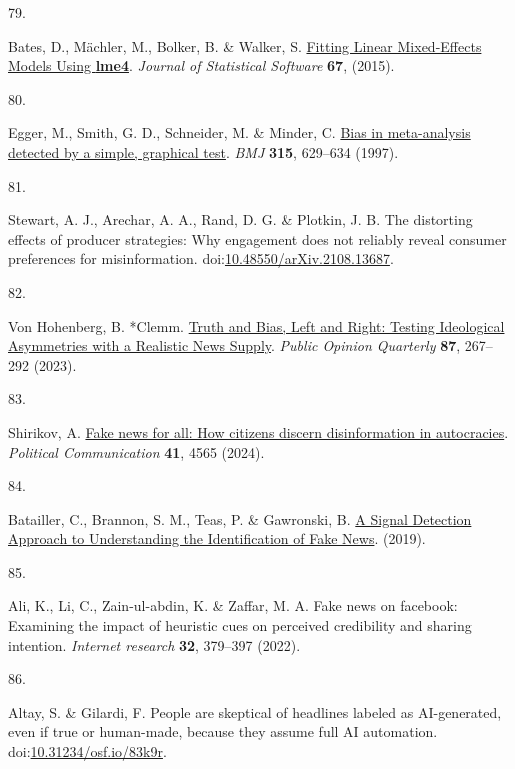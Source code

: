 \documentclass[
  man]{apa6}
\newlength{\cslhangindent}
\newlength{\csllabelwidth}
\newenvironment{CSLReferences}[2] %
 {\begin{list}{}{%
  \setlength{\itemindent}{0pt}
  \setlength{\leftmargin}{0pt}
  \setlength{\parsep}{0pt}
  \ifodd #1
   \setlength{\leftmargin}{\cslhangindent}
   \setlength{\itemindent}{-1\cslhangindent}
  \fi
  \setlength{\itemsep}{#2\baselineskip}}}
 {\end{list}}
\newcommand{\CSLLeftMargin}[1]{\parbox[t]{\csllabelwidth}{\strut#1\strut}}
\newcommand{\CSLRightInline}[1]{\parbox[t]{\linewidth - \csllabelwidth}{\strut#1\strut}}
\begin{document}
\begin{CSLReferences}{0}{0}
\CSLLeftMargin{79. }%
\CSLRightInline{Bates, D., Mächler, M., Bolker, B. \& Walker, S. \href{https://doi.org/10.18637/jss.v067.i01}{Fitting Linear Mixed-Effects Models Using {\textbf{lme4}}}. \emph{Journal of Statistical Software} \textbf{67}, (2015).}

\CSLLeftMargin{80. }%
\CSLRightInline{Egger, M., Smith, G. D., Schneider, M. \& Minder, C. \href{https://doi.org/10.1136/bmj.315.7109.629}{Bias in meta-analysis detected by a simple, graphical test}. \emph{BMJ} \textbf{315}, 629--634 (1997).}

\CSLLeftMargin{81. }%
\CSLRightInline{Stewart, A. J., Arechar, A. A., Rand, D. G. \& Plotkin, J. B. The distorting effects of producer strategies: Why engagement does not reliably reveal consumer preferences for misinformation. doi:\href{https://doi.org/10.48550/arXiv.2108.13687}{10.48550/arXiv.2108.13687}.}

\CSLLeftMargin{82. }%
\CSLRightInline{Von Hohenberg, B. *Clemm. \href{https://doi.org/10.1093/poq/nfad013}{Truth and Bias, Left and Right: Testing Ideological Asymmetries with a Realistic News Supply}. \emph{Public Opinion Quarterly} \textbf{87}, 267--292 (2023).}

\CSLLeftMargin{83. }%
\CSLRightInline{*Shirikov, A. \href{https://doi.org/10.1080/10584609.2023.2257618}{Fake news for all: How citizens discern disinformation in autocracies}. \emph{Political Communication} \textbf{41}, 4565 (2024).}

\CSLLeftMargin{84. }%
\CSLRightInline{Batailler, C., Brannon, S. M., Teas, P. \& Gawronski, B. \href{https://osf.io/uc9me/}{A Signal Detection Approach to Understanding the Identification of Fake News}. (2019).}

\CSLLeftMargin{85. }%
\CSLRightInline{*Ali, K., Li, C., Zain-ul-abdin, K. \& Zaffar, M. A. Fake news on facebook: Examining the impact of heuristic cues on perceived credibility and sharing intention. \emph{Internet research} \textbf{32}, 379--397 (2022).}

\CSLLeftMargin{86. }%
\CSLRightInline{*Altay, S. \& Gilardi, F. People are skeptical of headlines labeled as AI-generated, even if true or human-made, because they assume full AI automation. doi:\href{https://doi.org/10.31234/osf.io/83k9r}{10.31234/osf.io/83k9r}.}


\end{CSLReferences}
\end{document}
